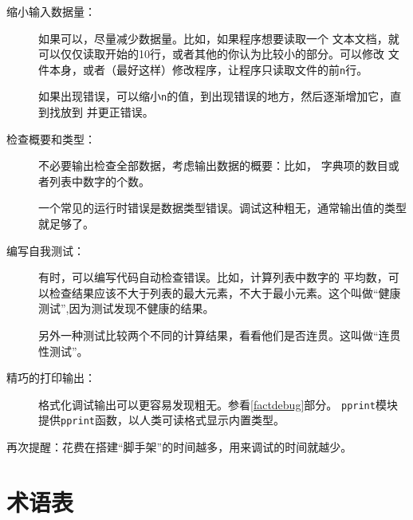 \begin{description}

\item [缩小输入数据量：]如果可以，尽量减少数据量。比如，如果程序想要读取一个
文本文档，就可以仅仅读取开始的10行，或者其他的你认为比较小的部分。可以修改
文件本身，或者（最好这样）修改程序，让程序只读取文件的前{\tt n}行。

如果出现错误，可以缩小{\tt n}的值，到出现错误的地方，然后逐渐增加它，直到找放到
并更正错误。

\item [检查概要和类型：]不必要输出检查全部数据，考虑输出数据的概要：比如，
字典项的数目或者列表中数字的个数。

一个常见的运行时错误是数据类型错误。调试这种粗无，通常输出值的类型就足够了。

\item [编写自我测试：]有时，可以编写代码自动检查错误。比如，计算列表中数字的
平均数，可以检查结果应该不大于列表的最大元素，不大于最小元素。这个叫做“健康测试”,因为测试发现不健康的结果。



另外一种测试比较两个不同的计算结果，看看他们是否连贯。这叫做“连贯性测试”。

\item
[精巧的打印输出：]格式化调试输出可以更容易发现粗无。参看\ref{factdebug}部分。
{\tt pprint}模块提供{\tt pprint}函数，以人类可读格式显示内置类型。


\end{description}

再次提醒：花费在搭建“脚手架”的时间越多，用来调试的时间就越少。





\section{术语表}


